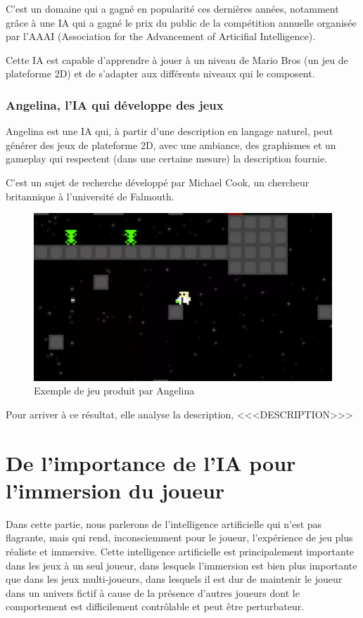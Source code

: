 \documentclass[a4paper, 12pt]{article} %
\begin{document}
C’est un domaine qui a gagné en popularité ces dernières années, notamment grâce à une IA qui a gagné le prix du public de la compétition annuelle organisée par l’AAAI (Association for the Advancement of Articifial Intelligence).

Cette IA est capable d’apprendre à jouer à un niveau de Mario Bros (un jeu de plateforme 2D) et de s’adapter aux différents niveaux qui le composent.

\newpage
\subsubsection{Angelina, l’IA qui développe des jeux}

Angelina est une IA qui, à partir d’une description en langage naturel, peut générer des jeux de plateforme 2D, avec une ambiance, des graphismes et un gameplay qui respectent (dans une certaine mesure) la description fournie.

C’est un sujet de recherche développé par Michael Cook, un chercheur britannique à l’université de Falmouth.

\begin{figure}[!h]%
	\begin{center} 
		\includegraphics[width=0.60\columnwidth]{images/angelina.png}%
		\caption{Exemple de jeu produit par Angelina}%
	\end{center}
\end{figure}

Pour arriver à ce résultat, elle analyse la description, <<<DESCRIPTION>>>


\newpage
\section{De l’importance de l’IA pour l’immersion du joueur}

Dans cette partie, nous parlerons de l’intelligence artificielle qui n’est pas flagrante, mais qui rend, inconsciemment pour le joueur, l'expérience de jeu plus réaliste et immersive. Cette intelligence artificielle est principalement importante dans les jeux à un seul joueur, dans lesquels l’immersion est bien plus importante que dans les jeux multi-joueurs, dans lesquels il est dur de maintenir le joueur dans un univers fictif à cause de la présence d’autres joueurs dont le comportement est difficilement contrôlable et peut être perturbateur.
\end{document}
